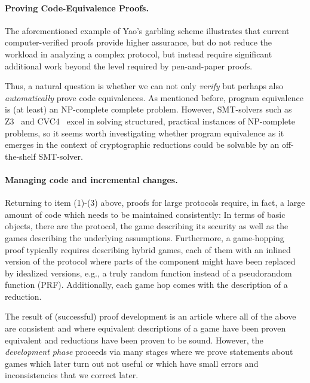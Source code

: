 \paragraph{Proving Code-Equivalence Proofs.}
The aforementioned example of Yao's garbling scheme illustrates that current
computer-verified proofs provide higher assurance, but do not reduce the
workload in analyzing a complex protocol, but instead
%
require significant additional work
beyond the level required by pen-and-paper proofs. 

Thus, a natural question is whether we can not only \emph{verify} but
perhaps also \emph{automatically} prove code equivalences. As mentioned
before, program equivalence is (at least) an NP-complete complete problem.
However, SMT-solvers such as Z3~\cite{X} and CVC4~\cite{X} excel in 
solving structured, practical instances of NP-complete problems, so it
seems worth investigating whether program equivalence as it emerges in
the context of cryptographic reductions could be solvable by an off-the-shelf
SMT-solver. %

\paragraph{Managing code and incremental changes.}
Returning to item (1)-(3) above, proofs for large protocols require, in fact,
a large amount of code which needs to be maintained consistently: In terms of
basic objects, there are the protocol, the game describing its security as well
 as the games describing the underlying assumptions. Furthermore, a game-hopping
proof typically requires describing hybrid games, each of them with an inlined
version of the protocol where parts of the component might have been replaced
by idealized versions, e.g., a truly random function instead of a pseudorandom function (PRF). Additionally, each game hop comes with the description of a reduction.

The result of (successful) proof development is an article where all of the
above are consistent and where equivalent descriptions of a game have
been proven equivalent and reductions have been proven to be sound.
However, the \emph{development phase} proceeds via many stages where
we prove statements about games which later turn out not useful or
which have small errors and inconsistencies that we correct later.

